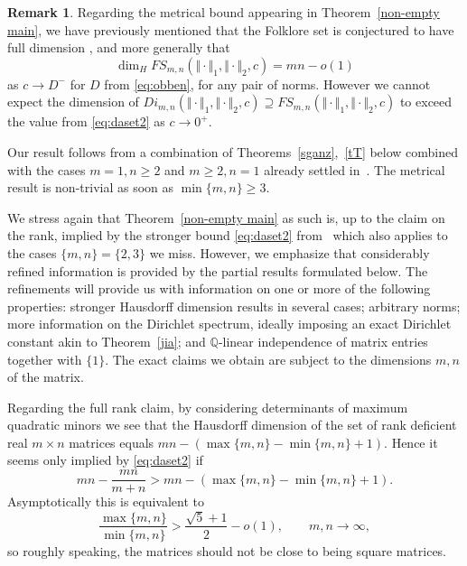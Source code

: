 \documentclass[10pt]{amsart}
\theoremstyle{definition}
\newtheorem{remark}{Remark}
\newcommand{\Q}{\mathbb{Q}}
\begin{document}

\begin{remark}
Regarding the metrical bound appearing in Theorem~\ref{non-empty main}, 
we have previously mentioned that the Folklore set is conjectured to have full dimension \cite[Problem 3.1]{BerGuaMarRamVel}, and more generally that 
$$\dim_H FS_{m,n}(\Vert\cdot\Vert_1,\Vert\cdot\Vert_2,c)=mn-o(1)$$ as $c\to D^{-}$ for $D$ from \eqref{eq:obben}, for any pair of norms. However we cannot expect the dimension of $Di_{m,n}(\Vert\cdot\Vert_1,\Vert\cdot\Vert_2,c) \supseteq FS_{m,n}(\Vert\cdot\Vert_1,\Vert\cdot\Vert_2,c)$ to exceed the value from \eqref{eq:daset2} as $c\to 0^{+}$. 
\end{remark}

Our result follows from a combination of Theorems~\ref{sganz},~\ref{tT} below combined with the cases 
$m=1, n\ge 2$ and $m\ge 2, n=1$ already settled in~\cite{j1, j2}. The metrical result is
non-trivial as soon as $\min\{ m,n\}\ge 3$.


We stress again that Theorem~\ref{non-empty main} as such is, up to the claim on the rank, implied by the stronger bound \eqref{eq:daset2} from~\cite{Dasetal} which also applies to the cases 
$\{ m,n\}= \{2,3\}$ we miss. However, 
we emphasize that considerably refined information is provided by the partial results formulated below. The refinements will provide us with information on one or more of the following properties: stronger Hausdorff dimension results in several cases; arbitrary norms; more information on the Dirichlet spectrum, ideally imposing an exact Dirichlet constant akin to Theorem~\ref{jia}; and $\Q$-linear independence of matrix entries together with $\{1\}$. The exact claims we obtain are subject to the dimensions $m,n$ of the matrix.

Regarding the full rank
claim, by considering determinants of maximum quadratic minors we see that the Hausdorff dimension of the set of rank deficient real $m\times n$ matrices equals $mn-(\max\{ m,n\}-\min\{m,n\}+1)$. Hence it seems only implied by \eqref{eq:daset2} if
 \begin{equation} \label{eq:bedingung1}
     mn-\frac{mn}{m+n} >  mn-(\max\{ m,n\}-\min\{m,n\}+1).
 \end{equation}
 Asymptotically this is equivalent to
 \begin{equation} \label{eq:yyx}
     \frac{\max\{ m,n\}}{\min\{m,n\}} > \frac{\sqrt{5}+1}{2}-o(1), \qquad m,n\to\infty,
 \end{equation}
 so roughly speaking, the matrices should not be close to being square matrices.
\end{document}
